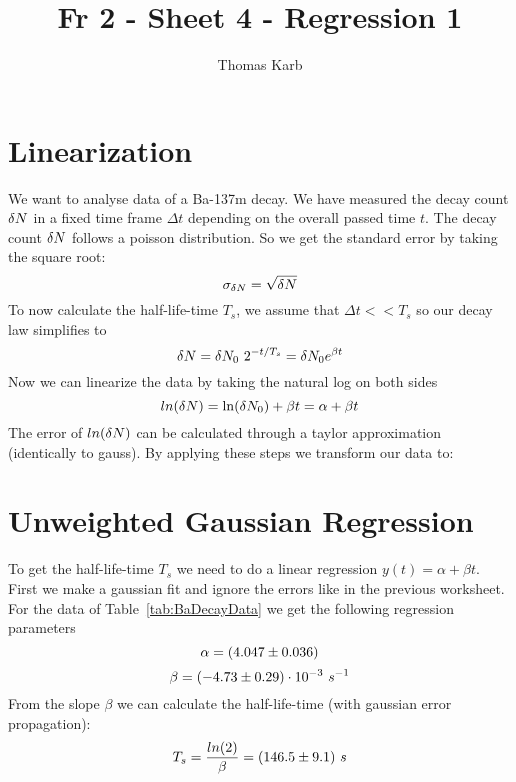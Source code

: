 \documentclass[11pt]{article}
\begin{document}
    \author{Thomas Karb}
    \title{Fr 2 - Sheet 4 - Regression 1}
    
    \maketitle
    
    \section{Linearization}
    
    We want to analyse data of a Ba-137m decay.
    We have measured the decay count $\delta N$ in a fixed time frame $\Delta t$ depending on the overall passed time $t$.
    The decay count $\delta N$ follows a poisson distribution. So we get the standard error by taking the square root:
    \begin{equation*}
        \sigma_{\delta N} = \sqrt {\delta N}
    \end{equation*}
    To now calculate the half-life-time $T_s$, we assume that $\Delta t << T_s$ so our decay law simplifies to
    \begin{equation*}
        \delta N = \delta N_0 \ 2^{-t / T_s} = \delta N_0 e^{\beta t}
    \end{equation*}
    Now we can linearize the data by taking the natural log on both sides
    \begin{equation*}
        ln(\delta N) = \ln(\delta N_0)+\beta t = \alpha + \beta t
    \end{equation*}
    The error of $ln(\delta N)$ can be calculated through a taylor approximation (identically to gauss).
    By applying these steps we transform our data to:
    
    
    
    \pagebreak
    
    \section{Unweighted Gaussian Regression}
    To get the half-life-time $T_s$ we need to do a linear regression $y(t) = \alpha + \beta t$. First we make a gaussian
    fit and ignore the errors like in the previous worksheet.
    For the data of Table~\ref{tab:BaDecayData} we get the following regression parameters
    \begin{equation*}
        \alpha = (4.047 \pm 0.036)
    \end{equation*}
    \begin{equation*}
        \beta = (-4.73 \pm 0.29) \cdot 10^{-3}\ s^{-1}
    \end{equation*}
    From the slope $\beta$ we can calculate the half-life-time (with gaussian error propagation):
    \begin{equation*}
        T_s = \frac{ln(2)}{\beta} = (146.5 \pm 9.1)\ s
    \end{equation*}
    
\end{document}
